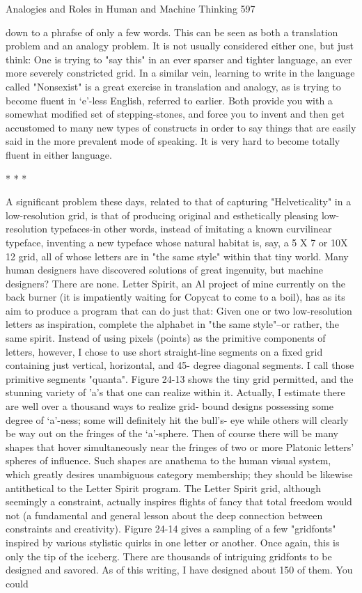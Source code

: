 Analogies and Roles in Human and Machine Thinking                                             597

down to a phrafse of only a few words. This can be seen as both a translation problem
and an analogy problem. It is not usually considered either one, but just think: One is
trying to "say this" in an ever sparser and tighter language, an ever more severely
constricted grid. In a similar vein, learning to write in the language called "Nonsexist"
is a great exercise in translation and analogy, as is trying to become fluent in `e'-less
English, referred to earlier. Both provide you with a somewhat modified set of
stepping-stones, and force you to invent and then get accustomed to many new types
of constructs in order to say things that are easily said in the more prevalent mode of
speaking. It is very hard to become totally fluent in either language.

                                        *   *   *

        A significant problem these days, related to that of capturing "Helveticality" in
a low-resolution grid, is that of producing original and esthetically pleasing low-
resolution typefaces-in other words, instead of imitating a known curvilinear typeface,
inventing a new typeface whose natural habitat is, say, a 5 X 7 or 10X 12 grid, all of
whose letters are in "the same style" within that tiny world. Many human designers
have discovered solutions of great ingenuity, but machine designers? There are none.
        Letter Spirit, an Al project of mine currently on the back burner (it is
impatiently waiting for Copycat to come to a boil), has as its aim to produce a
program that can do just that: Given one or two low-resolution letters as inspiration,
complete the alphabet in "the same style"--or rather, the same spirit. Instead of using
pixels (points) as the primitive components of letters, however, I chose to use short
straight-line segments on a fixed grid containing just vertical, horizontal, and 45-
degree diagonal segments. I call those primitive segments "quanta". Figure 24-13
shows the tiny grid permitted, and the stunning variety of 'a's that one can realize
within it. Actually, I estimate there are well over a thousand ways to realize grid-
bound designs possessing some degree of `a'-ness; some will definitely hit the bull's-
eye while others will clearly be way out on the fringes of the `a'-sphere. Then of
course there will be many shapes that hover simultaneously near the fringes of two or
more Platonic letters' spheres of influence. Such shapes are anathema to the human
visual system, which greatly desires unambiguous category membership; they should
be likewise antithetical to the Letter Spirit program.
        The Letter Spirit grid, although seemingly a constraint, actually inspires flights
of fancy that total freedom would not (a fundamental and general lesson about the
deep connection between constraints and creativity). Figure 24-14 gives a sampling of
a few "gridfonts" inspired by various stylistic quirks in one letter or another. Once
again, this is only the tip of the iceberg. There are thousands of intriguing gridfonts to
be designed and savored. As of this writing, I have designed about 150 of them. You
could




